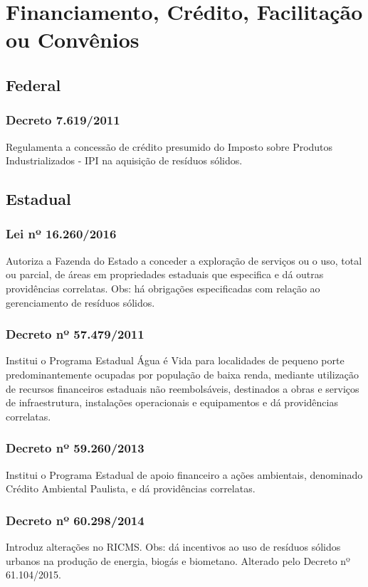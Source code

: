 \section{Financiamento, Crédito, Facilitação ou Convênios}
\begin{subapend}
	\subsection{Federal}
	\begin{subsubapend}
		\subsubsection{Decreto 7.619/2011}
		Regulamenta a concessão de crédito presumido do Imposto sobre Produtos Industrializados - IPI na aquisição de resíduos sólidos.
	\end{subsubapend}
\end{subapend}
 \begin{subapend}
 	\subsection{Estadual}
 	\begin{subsubapend}
 		 \subsubsection{Lei nº 16.260/2016}
 		Autoriza a Fazenda do Estado a conceder a exploração de serviços ou o uso, total ou parcial, de áreas em propriedades estaduais que especifica e dá outras providências correlatas. Obs: há obrigações especificadas com relação ao gerenciamento de resíduos sólidos.
 		\subsubsection{Decreto nº 57.479/2011}
 		Institui o Programa Estadual Água é Vida para localidades de pequeno porte predominantemente ocupadas por população de baixa renda, mediante utilização de recursos financeiros estaduais não reembolsáveis, destinados a obras e serviços de infraestrutura, instalações operacionais e equipamentos e dá providências correlatas.
 		\subsubsection{Decreto nº 59.260/2013}
 		Institui o Programa Estadual de apoio financeiro a ações ambientais, denominado Crédito Ambiental Paulista, e dá providências correlatas.
 		\subsubsection{Decreto nº 60.298/2014}
 		Introduz alterações no RICMS. Obs: dá incentivos ao uso de resíduos sólidos urbanos na produção de energia, biogás e biometano. Alterado pelo Decreto nº 61.104/2015.
 	\end{subsubapend}
 \end{subapend}
 

